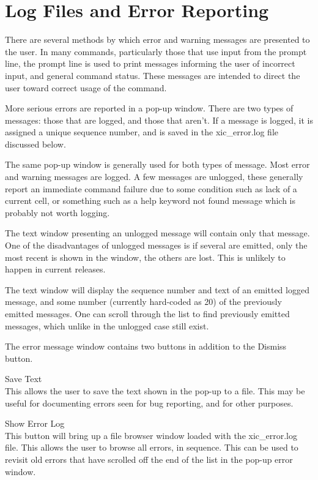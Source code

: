 \section{Log Files and Error Reporting}

There are several methods by which error and warning messages are
presented to the user.  In many commands, particularly those that use
input from the prompt line, the prompt line is used to print messages
informing the user of incorrect input, and general command status. 
These messages are intended to direct the user toward correct usage of
the command.

More serious errors are reported in a pop-up window.  There are two
types of messages:  those that are logged, and those that aren't.  If
a message is logged, it is assigned a unique sequence number, and is
saved in the {\vt xic\_error.log} file discussed below.

The same pop-up window is generally used for both types of message. 
Most error and warning messages are logged.  A few messages are
unlogged, these generally report an immediate command failure due to
some condition such as lack of a current cell, or something such as a
help keyword not found message which is probably not worth logging.

The text window presenting an unlogged message will contain only that
message.  One of the disadvantages of unlogged messages is if several
are emitted, only the most recent is shown in the window, the others
are lost.  This is unlikely to happen in current {\Xic} releases.

The text window will display the sequence number and text of an
emitted logged message, and some number (currently hard-coded as 20)
of the previously emitted messages.  One can scroll through the list
to find previously emitted messages, which unlike in the unlogged case
still exist.

The error message window contains two buttons in addition to the
{\cb Dismiss} button.

\begin{description}
\item{\cb Save Text}\\
This allows the user to save the text shown in the pop-up to a file. 
This may be useful for documenting errors seen for bug reporting, and
for other purposes.

\item{\cb Show Error Log}\\
This button will bring up a file browser window loaded with the {\vt
xic\_error.log} file.  This allows the user to browse all errors, in
sequence.  This can be used to revisit old errors that have scrolled
off the end of the list in the pop-up error window.
\end{description}

